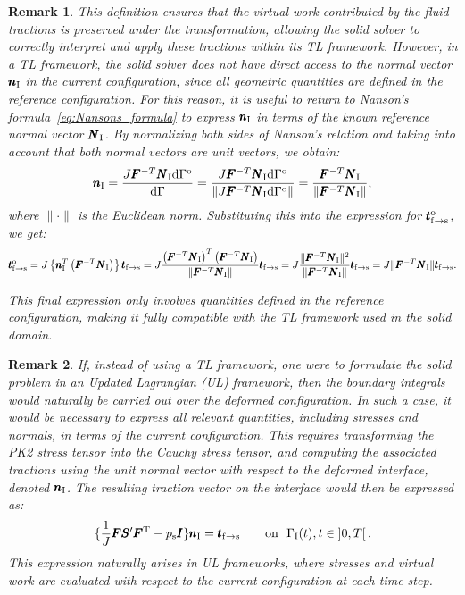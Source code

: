 \documentclass[11pt,english]{article}
\def\psolid{p_{\rm{s}}}                         %
\def\devPK{\pmb{S}^\prime}                      %
\def\F{\pmb{F}}                             %
\def\Ftrans{\pmb{F}^{\rm{T}}}               %
\def\boundaryFSI{\Gamma_{\rm{I}}}
\def\FSItract{\pmb{t}_{\rm{f}\to{\rm{s}}}}
\def\FSItractref{\FSItract^{\rm{o}}}
\def\NormalFSI{\pmb{N}_{\rm{I}}}
\def\normalFSI{\pmb{n}_{\rm{I}}}
\def\timeint{\left ] 0,T\right[}                         %
\newtheorem{remark}{Remark}[section]
\begin{document}
\begin{remark}
This definition ensures that the virtual work contributed by the fluid tractions is preserved under the transformation, allowing the solid solver to correctly interpret and apply these tractions within its TL framework. However, in a TL framework, the solid solver does not have direct access to the normal vector $\normalFSI$ in the current configuration, since all geometric quantities are defined in the reference configuration. For this reason, it is useful to return to Nanson's formula~\eqref{eq:Nansons_formula} to express $\normalFSI$ in terms of the known reference normal vector $\NormalFSI$. By normalizing both sides of Nanson's relation and taking into account that both normal vectors are unit vectors, we obtain:
\begin{equation*}
    \normalFSI = \frac{J \pmb{F}^{-T} \NormalFSI \mathrm{d}\Gamma^{\rm{o}}}{\mathrm{d}\Gamma} =  \frac{J \pmb{F}^{-T} \NormalFSI \mathrm{d}\Gamma^{\rm{o}}}{\| J \pmb{F}^{-T} \NormalFSI \mathrm{d}\Gamma^{\rm{o}} \|} = \frac{\pmb{F}^{-T} \NormalFSI }{\|\pmb{F}^{-T} \NormalFSI \|},
\end{equation*}
where $\| \cdot \|$ is the Euclidean norm. Substituting this into the expression for $\FSItractref$, we get:
\begin{equation*}
    \FSItractref =  J \left \lbrace \normalFSI^T \left( \pmb{F}^{-T} \NormalFSI \right) \right \rbrace \FSItract = J \frac{\left (\pmb{F}^{-T} \NormalFSI \right )^T \left (\pmb{F}^{-T} \NormalFSI \right )}{\|\pmb{F}^{-T} \NormalFSI \|} \FSItract =  J \frac{\|\pmb{F}^{-T} \NormalFSI \|^2}{\|\pmb{F}^{-T} \NormalFSI \|} \FSItract = J \|\pmb{F}^{-T} \NormalFSI \| \FSItract.
\end{equation*}

This final expression only involves quantities defined in the reference configuration, making it fully compatible with the TL framework used in the solid domain.
\end{remark}

\begin{remark}
If, instead of using a TL framework, one were to formulate the solid problem in an Updated Lagrangian (UL) framework, then the boundary integrals would naturally be carried out over the deformed configuration. In such a case, it would be necessary to express all relevant quantities, including stresses and normals, in terms of the current configuration. This requires transforming the PK2 stress tensor into the Cauchy stress tensor, and computing the associated tractions using the unit normal vector with respect to the deformed interface, denoted $\normalFSI$. The resulting traction vector on the interface would then be expressed as:
$$
\lbrace \frac{1}{J} \F \devPK \Ftrans - \psolid \pmb{I} \rbrace \normalFSI = \FSItract \qquad \hbox{on }~\boundaryFSI(t), t \in \timeint.
$$
This expression naturally arises in UL frameworks, where stresses and virtual work are evaluated with respect to the current configuration at each time step.
\end{remark}
\end{document}
